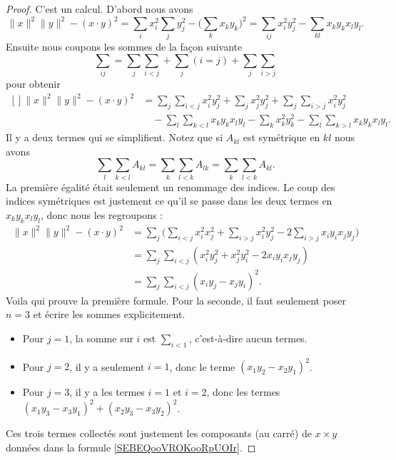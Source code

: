 \begin{proof}
    C'est un calcul. D'abord nous avons
    \begin{equation}
        \| x \|^2\| y \|^2-(x\cdot y)^2=\sum_ix_i^2\sum_jy_j^2-\big( \sum_k x_ky_k  \big)^2=\sum_{ij}x_i^2y_j^2-\sum_{kl}x_ky_kx_ly_l.
    \end{equation}
    Ensuite nous coupons les sommes de la façon suivante
    \begin{equation}
        \sum_{ij}=\sum_j\sum_{i<j}+\sum_j(i=j)+\sum_j\sum_{i>j}
    \end{equation}
    pour obtenir
    \begin{equation}
        \begin{aligned}[]
            \| x \|^2\| y \|^2-(x\cdot y)^2&=\sum_j\sum_{i<j}x_i^2y_j^2+\sum_jx_j^2y_j^2+\sum_j\sum_{i>j}x_i^2y_j^2\\
                &\quad-\sum_l\sum_{k<l}x_ky_kx_ly_l-\sum_kx_k^2y_k^2-\sum_l\sum_{k>l}x_ky_kx_ly_l.
        \end{aligned}
    \end{equation}
    Il y a deux termes qui se simplifient. Notez que si \( A_{kl}\) est symétrique en \( kl\) nous avons
    \begin{equation}
        \sum_l\sum_{k<l}A_{kl}=\sum_k\sum_{l<k}A_{lk}=\sum_k\sum_{l<k}A_{kl}.
    \end{equation}
    La première égalité était seulement un renommage des indices. Le coup des indices symétriques est justement ce qu'il se passe dans les deux termes en\( x_ky_kx_ly_l\), donc nous les regroupons :
    \begin{subequations}
        \begin{align}
            \| x \|^2\| y \|^2-(x\cdot y)^2&=\sum_j\big( \sum_{i<j}x_i^2x_j^2+\sum_{i>j}x_i^2y_j^2-2\sum_{i>j}x_iy_ix_jy_j \big)\\
            &=\sum_j\sum_{i<j}(x_i^2y_j^2+x_j^2y_i^2-2x_iy_ix_jy_j)\\
            &=\sum_j\sum_{i<j}(x_iy_j-x_jy_i)^2.
        \end{align}
    \end{subequations}
    Voila qui prouve la première formule. Pour la seconde, il faut seulement poser \( n=3\) et écrire les sommes explicitement.

    \begin{itemize}
        \item 
    Pour \( j=1\), la somme sur \( i\) est \( \sum_{i<1}\), c'est-à-dire aucun termes.
\item
    Pour \( j=2\), il y a seulement \( i=1\), donc le terme \( (x_1y_2-x_2y_1)^2\).

\item
    Pour \( j=3\), il y a les termes \( i=1\) et \( i=2\), donc les termes \( (x_1y_3-x_3y_1)^2+(x_2y_3-x_3y_2)^2\).
    \end{itemize}
    Ces trois termes collectés sont justement les composants (au carré) de \( x\times y\) données dans la formule \eqref{SEBEQooVROKooRpUOIr}.
\end{proof}

